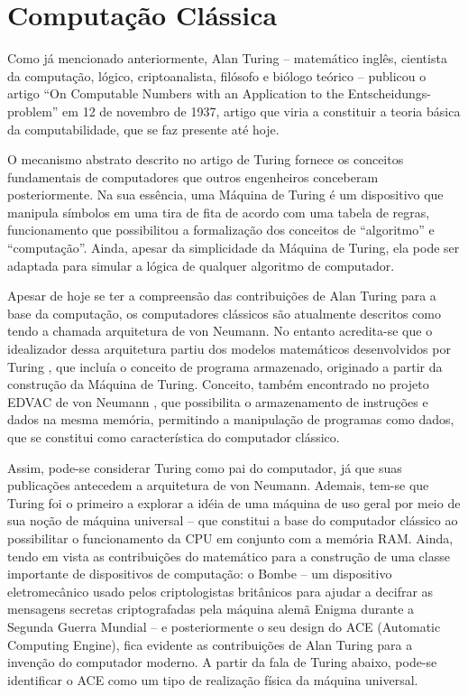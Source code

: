 \section{Computação Clássica} 
\label{classic_comp}
Como já mencionado anteriormente, Alan Turing – matemático inglês, cientista da computação, lógico, criptoanalista, filósofo e biólogo teórico – publicou o artigo ``On Computable Numbers with an Application to the Entscheidungs-problem'' \cite{8} em 12 de novembro de 1937, artigo que viria a constituir a teoria básica da computabilidade, que se faz presente até hoje. 

O mecanismo abstrato descrito no artigo de Turing fornece os conceitos fundamentais de computadores que outros engenheiros conceberam posteriormente. Na sua essência, uma Máquina de Turing é um dispositivo que manipula símbolos em uma tira de fita de acordo com uma tabela de regras, funcionamento que possibilitou a formalização dos conceitos de ``algoritmo'' e ``computação''. Ainda, apesar da simplicidade da Máquina de Turing, ela pode ser adaptada para simular a lógica de qualquer algoritmo de computador.

Apesar de hoje se ter a compreensão das contribuições de Alan Turing para a base da computação, os computadores clássicos são atualmente descritos como tendo a chamada arquitetura de von Neumann. No entanto acredita-se que o idealizador dessa arquitetura partiu dos modelos matemáticos desenvolvidos por Turing \cite{10}, que incluía o conceito de programa armazenado, originado a partir da construção da Máquina de Turing. Conceito, também encontrado no projeto EDVAC de von Neumann \cite{9}, que possibilita o armazenamento de instruções e dados na mesma memória, permitindo a manipulação de programas como dados, que se constitui como característica do computador clássico.  

Assim, pode-se considerar Turing como pai do computador, já que suas publicações antecedem a arquitetura de von Neumann. Ademais, tem-se que Turing foi o primeiro a explorar a idéia de uma máquina de uso geral por meio de sua noção de máquina universal – que constitui a base do computador clássico ao possibilitar o funcionamento da CPU em conjunto com a memória RAM. Ainda, tendo em vista as contribuições do matemático para a construção de uma classe importante de dispositivos de computação: o Bombe – um dispositivo eletromecânico usado pelos criptologistas britânicos para ajudar a decifrar as mensagens secretas criptografadas pela máquina alemã Enigma durante a Segunda Guerra Mundial – e posteriormente o seu design do ACE (Automatic Computing Engine), fica evidente as contribuições de Alan Turing para a invenção do computador moderno. A partir da fala de Turing abaixo, pode-se identificar o ACE como um tipo de realização física da máquina universal.

